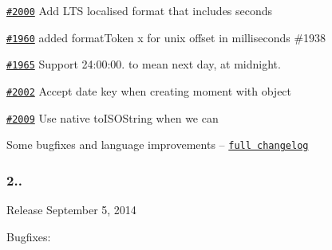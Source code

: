 \begin{DoxyItemize}
\item \href{https://github.com/moment/moment/issues/2000}{\tt \#2000} Add L\+TS localised format that includes seconds
\item \href{https://github.com/moment/moment/issues/1960}{\tt \#1960} added format\+Token \textquotesingle{}x\textquotesingle{} for unix offset in milliseconds \#1938
\item \href{https://github.com/moment/moment/issues/1965}{\tt \#1965} Support 24\+:00\+:00. to mean next day, at midnight.
\item \href{https://github.com/moment/moment/issues/2002}{\tt \#2002} Accept \textquotesingle{}date\textquotesingle{} key when creating moment with object
\item \href{https://github.com/moment/moment/issues/2009}{\tt \#2009} Use native to\+I\+S\+O\+String when we can
\end{DoxyItemize}

Some bugfixes and language improvements -- \href{https://gist.github.com/ichernev/a4fcb0a46d74e4b9b996}{\tt full changelog}

\subsubsection*{2..}


\begin{DoxyItemize}
\item Release September 5, 2014
\end{DoxyItemize}

Bugfixes\+:


